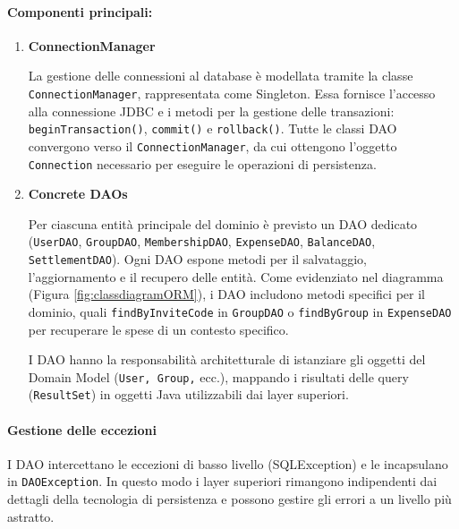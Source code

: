 \paragraph{Componenti principali:}
\begin{enumerate}
    \item \textbf{ConnectionManager}
    
    La gestione delle connessioni al database è modellata tramite la classe \texttt{ConnectionManager}, rappresentata come Singleton. Essa fornisce l’accesso alla connessione JDBC e i metodi per la gestione delle transazioni: \texttt{beginTransaction()}, \texttt{commit()} e \texttt{rollback()}.
    Tutte le classi DAO convergono verso il \texttt{ConnectionManager}, da cui ottengono l'oggetto \texttt{Connection} necessario per eseguire le operazioni di persistenza.

    \item \textbf{Concrete DAOs}
    
    Per ciascuna entità principale del dominio è previsto un DAO dedicato (\texttt{UserDAO}, \texttt{GroupDAO}, \texttt{MembershipDAO}, \texttt{ExpenseDAO}, \texttt{BalanceDAO}, \texttt{SettlementDAO}). Ogni DAO espone metodi per il salvataggio, l'aggiornamento e il recupero delle entità. 
    Come evidenziato nel diagramma (Figura \ref{fig:classdiagramORM}), i DAO includono metodi specifici per il dominio, quali \texttt{findByInviteCode} in \texttt{GroupDAO} o \texttt{findByGroup} in \texttt{ExpenseDAO} per recuperare le spese di un contesto specifico.

    I DAO hanno la responsabilità architetturale di istanziare gli oggetti del Domain Model (\texttt{User, Group,} ecc.), mappando i risultati delle query (\texttt{ResultSet}) in oggetti Java utilizzabili dai layer superiori.
\end{enumerate}

\paragraph{Gestione delle eccezioni}
I DAO intercettano le eccezioni di basso livello (SQLException) e le incapsulano in \texttt{DAOException}.  
In questo modo i layer superiori rimangono indipendenti dai dettagli della tecnologia di persistenza e possono gestire gli errori a un livello più astratto.



